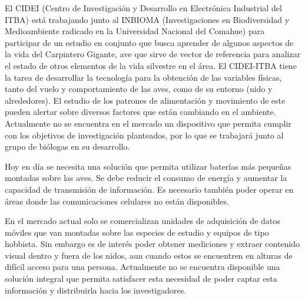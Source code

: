 El CIDEI (Centro de Investigación y Desarrollo en Electrónica Industrial del ITBA) está trabajando junto al INBIOMA (Investigaciones en Biodiversidad y Medioambiente radicado en la Universidad Nacional del Comahue) para participar de un estudio en conjunto que busca aprender de algunos aspectos de la vida del Carpintero Gigante, ave que sirve de vector de referencia para analizar el estado de otros elementos de la vida silvestre en el área\cite{ref:PaperValeriaOjeda}. El CIDEI-ITBA tiene la tarea de desarrollar la tecnología para la obtención de las variables físicas, tanto del vuelo y comportamiento de las aves, como de su entorno (nido y alrededores). El estudio de los patrones de alimentación y movimiento de este pueden alertar sobre diversos factores que están cambiando en el ambiente. Actualmente no se encuentra en el mercado un dispositivo que permita cumplir con los objetivos de investigación planteados, por lo que se trabajará junto al grupo de biólogas en su desarrollo.

Hoy en día se necesita una solución que permita utilizar baterías más pequeñas montadas sobre las aves. Se debe reducir el consumo de energía y aumentar la capacidad de transmisión de información. Es necesario también poder operar en áreas donde las comunicaciones celulares no están disponibles.

En el mercado actual solo se comercializan unidades de adquisición de datos móviles que van montadas sobre las especies de estudio y equipos de tipo hobbista. Sin embargo es de interés poder obtener mediciones y extraer contenido visual dentro y fuera de los nidos, aun cuando estos se encuentren en alturas de difícil acceso para una persona. Actualmente no se encuentra disponible una solución integral que permita satisfacer esta necesidad de poder captar esta información y distribuirla hacia los investigadores.

%
